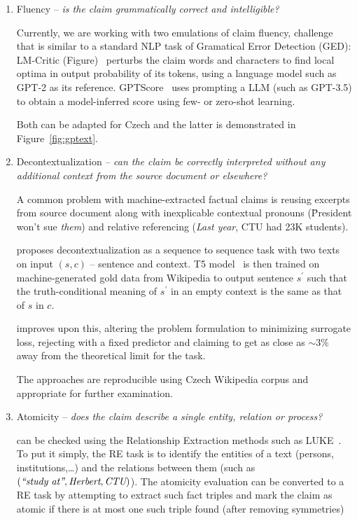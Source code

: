 \begin{enumerate}
    \item {\techbf Fluency} -- \textit{is the claim grammatically correct and intelligible?}
    
    Currently, we are working with two emulations of claim fluency, challenge that is similar to a standard NLP task of Gramatical Error Detection (GED): \textsf{LM-Critic} (Figure)~\cite{yasunaga-etal-2021-lm} perturbs the claim words and characters to find local optima in output probability of its tokens, using a language model such as GPT-2 as its reference. \textsf{GPTScore}~\cite{fu2023gptscore} uses prompting a LLM (such as GPT-3.5) to obtain a model-inferred score using few- or zero-shot learning.
    
    Both can be adapted for Czech and the latter is demonstrated in Figure~\ref{fig:gptext}.
    \item {\techbf Decontextualization} -- \textit{can the claim be correctly interpreted without any additional context from the source document or elsewhere?}
    
    A common problem with machine-extracted factual claims is reusing excerpts from source document along with inexplicable contextual pronouns (\"{President won't sue \textit{them}}) and relative referencing (\"{\textit{Last year}, CTU had 23K students}).

\cite{choi-etal-2021-decontextualization} proposes decontextualization as a sequence to sequence task with two texts on input $(s,c)$ -- sentence and context.
    T5 model~\cite{t5-11b} is then trained on machine-generated gold data from Wikipedia to output sentence $s^\prime$ such that the truth-conditional meaning of $s^\prime$ in an empty context is the same as that of $s$ in $c$.

    \cite{mohri2023learning} improves upon this, altering the problem formulation to minimizing surrogate loss, rejecting with a fixed predictor and claiming to get as close as $\sim3\%$ away from the theoretical limit for the task.

    The approaches are reproducible using Czech Wikipedia corpus and appropriate for further examination.

    \item {\techbf Atomicity} --  \textit{does the claim describe a single entity, relation or process?}
    
    can be checked using the Relationship Extraction methods such as LUKE~\cite{yamada2020luke}. To put it simply, the RE task is to identify the entities of a text (persons, institutions,\dots) and the relations between them (such as $(\textit{\"{study at}}, \textit{Herbert}, \textit{CTU})$). The atomicity evaluation can be converted to a RE task by attempting to extract such fact triples and mark the claim as atomic if there is at most one such triple found (after removing symmetries)


\end{enumerate}
